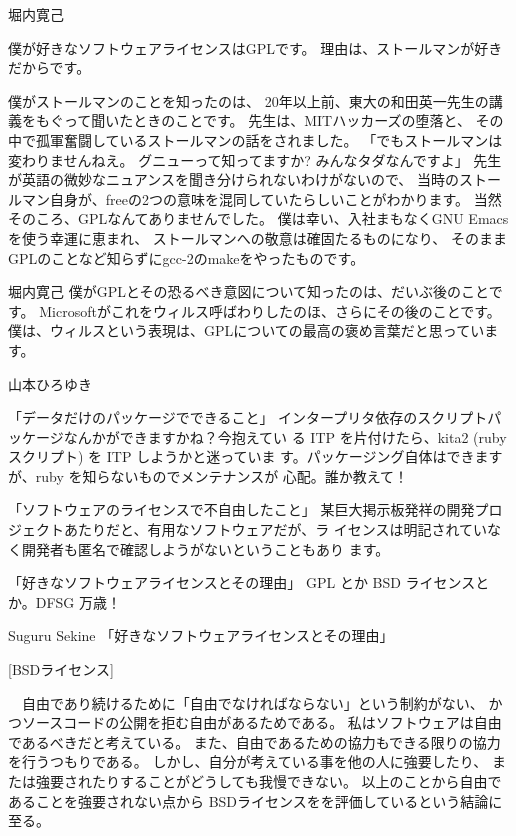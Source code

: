 \documentclass[cjk,dvipdfmx,12pt]{beamer}
\begin{document}
\begin{frame}{堀内寛己}

僕が好きなソフトウェアライセンスはGPLです。
理由は、ストールマンが好きだからです。

僕がストールマンのことを知ったのは、
20年以上前、東大の和田英一先生の講義をもぐって聞いたときのことです。
先生は、MITハッカーズの堕落と、
その中で孤軍奮闘しているストールマンの話をされました。
「でもストールマンは変わりませんねえ。
グニューって知ってますか? みんなタダなんですよ」
先生が英語の微妙なニュアンスを聞き分けられないわけがないので、
当時のストールマン自身が、freeの2つの意味を混同していたらしいことがわかります。
当然そのころ、GPLなんてありませんでした。
僕は幸い、入社まもなくGNU Emacsを使う幸運に恵まれ、
ストールマンへの敬意は確固たるものになり、
そのままGPLのことなど知らずにgcc-2のmakeをやったものです。
\end{frame}\begin{frame}{堀内寛己}
僕がGPLとその恐るべき意図について知ったのは、だいぶ後のことです。
Microsoftがこれをウィルス呼ばわりしたのほ、さらにその後のことです。
僕は、ウィルスという表現は、GPLについての最高の褒め言葉だと思っています。

\end{frame}\begin{frame}{山本ひろゆき}

「データだけのパッケージでできること」
インタープリタ依存のスクリプトパッケージなんかができますかね？今抱えてい
る ITP を片付けたら、kita2 (ruby スクリプト) を ITP しようかと迷っていま
す。パッケージング自体はできますが、ruby を知らないものでメンテナンスが
心配。誰か教えて！

「ソフトウェアのライセンスで不自由したこと」
某巨大掲示板発祥の開発プロジェクトあたりだと、有用なソフトウェアだが、ラ
イセンスは明記されていなく開発者も匿名で確認しようがないということもあり
ます。

「好きなソフトウェアライセンスとその理由」
GPL とか BSD ライセンスとか。DFSG 万歳！



\end{frame}\begin{frame}{Suguru Sekine}
「好きなソフトウェアライセンスとその理由」

[BSDライセンス]

　自由であり続けるために「自由でなければならない」という制約がない、
かつソースコードの公開を拒む自由があるためである。
私はソフトウェアは自由であるべきだと考えている。
また、自由であるための協力もできる限りの協力を行うつもりである。
しかし、自分が考えている事を他の人に強要したり、
または強要されたりすることがどうしても我慢できない。
以上のことから自由であることを強要されない点から
BSDライセンスをを評価しているという結論に至る。


\end{frame}
\end{document}
